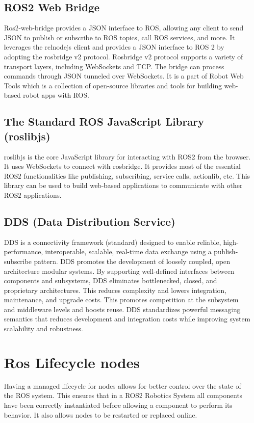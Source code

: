 	\subsection{ROS2 Web Bridge}
	\label{Grundlagen:ROS2:2WebBridge}
	Ros2-web-bridge provides a JSON interface to ROS, allowing any client to send JSON to publish or subscribe to ROS topics, call ROS services, and more. It leverages the rclnodejs client and provides a JSON interface to ROS 2 by adopting the rosbridge v2 protocol. Rosbridge v2 protocol supports a variety of transport layers, including WebSockets and TCP. The bridge can process commands through JSON tunneled over WebSockets. It is a part of  Robot Web Tools which is a collection of open-source libraries and tools for building web-based robot apps with ROS.\cite{ros2OnWB}

	\subsection{The Standard ROS JavaScript Library (roslibjs) }
	\label{Grundlagen:ROS2:RosLibJS}
	roslibjs is the core JavaScript library for interacting with ROS2 from the browser. It uses WebSockets to connect with rosbridge. It provides most of the essential ROS2 functionalities like publishing, subscribing, service calls, actionlib, etc. This library can be used to build web-based applications to communicate with other ROS2 applications.
	

	\subsection{DDS (Data Distribution Service)}
	\label{Grundlagen:DDS}
	DDS is a connectivity framework (standard) designed to enable reliable, high-performance, interoperable, scalable, real-time data exchange using a publish-subscribe pattern. DDS promotes the development of loosely coupled, open architecture modular systems. By supporting well-defined interfaces between components and subsystems, DDS eliminates bottlenecked, closed, and proprietary architectures. This reduces complexity and lowers integration, maintenance, and upgrade costs. This promotes competition at the subsystem and middleware levels and boosts reuse. DDS standardizes powerful messaging semantics that reduces development and integration costs while improving system scalability and robustness.\cite{ros2OnDDSRti}
		
	
	\section{Ros Lifecycle nodes}
	\label{Grundlagen:ROS2:Lifecycle}
	Having a managed lifecycle for nodes allows for better control over the state of the ROS system. This ensures that in a ROS2 Robotics System all components have been correctly instantiated before allowing a component to perform its behavior. It also allows nodes to be restarted or replaced online.\\

